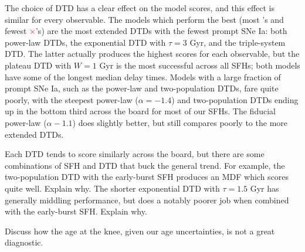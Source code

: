 \documentclass[twocolumn,twocolappendix,linenumbers]{aastex631}
\newcommand{\yes}{\textcolor{green}{\checkmark}\xspace}
\newcommand{\no}{\textcolor{red}{$\times$}\xspace}
\newcommand{\todo}[1]{{\color{red}#1}}
\begin{document}

The choice of DTD has a clear effect on the model scores, and this effect is similar for every observable. The models which perform the best (most \yes's and fewest \no's) are the most extended DTDs with the fewest prompt SNe Ia: both power-law DTDs, the exponential DTD with $\tau=3$ Gyr, and the triple-system DTD. The latter actually produces the highest scores for each observable, but the plateau DTD with $W=1$ Gyr is the most successful across all SFHs; both models have some of the longest median delay times. Models with a large fraction of prompt SNe Ia, such as the power-law and two-population DTDs, fare quite poorly, with the steepest power-law ($\alpha=-1.4$) and two-population DTDs ending up in the bottom third across the board for most of our SFHs. The fiducial power-law ($\alpha-1.1$) does slightly better, but still compares poorly to the more extended DTDs.

Each DTD tends to score similarly across the board, but there are some combinations of SFH and DTD that buck the general trend. For example, the two-population DTD with the early-burst SFH produces an MDF which scores quite well. \todo{Explain why.} The shorter exponential DTD with $\tau=1.5$ Gyr has generally middling performance, but does a notably poorer job when combined with the early-burst SFH. \todo{Explain why.}

\todo{Discuss how the age at the knee, given our age uncertainties, is not a great diagnostic.}
\end{document}
